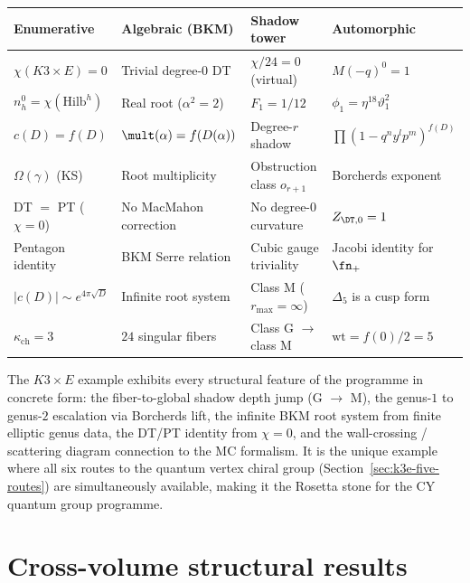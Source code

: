 \begin{center}
\renewcommand{\arraystretch}{1.3}
\begin{tabular}{@{}llll@{}}
\textbf{Enumerative} & \textbf{Algebraic (BKM)} & \textbf{Shadow tower} & \textbf{Automorphic} \\ \hline
$\chi(K3 \times E) = 0$ & Trivial degree-$0$ DT & $\chi/24 = 0$ (virtual) & $M(-q)^0 = 1$ \\
$n_h^0 = \chi(\mathrm{Hilb}^h)$ & Real root ($\alpha^2 = 2$) & $F_1 = 1/12$ & $\phi_1 = \eta^{18}\vartheta_1^2$ \\
$c(D) = f(D)$ & $\mult(\alpha) = f(D(\alpha))$ & Degree-$r$ shadow & $\prod (1 - q^ny^lp^m)^{f(D)}$ \\
$\Omega(\gamma)$ (KS) & Root multiplicity & Obstruction class $o_{r+1}$ & Borcherds exponent \\
DT $=$ PT ($\chi = 0$) & No MacMahon correction & No degree-$0$ curvature & $Z_{\DT,0} = 1$ \\
Pentagon identity & BKM Serre relation & Cubic gauge triviality & Jacobi identity for $\fn_+$ \\
$|c(D)| \sim e^{4\pi\sqrt{D}}$ & Infinite root system & Class M ($r_{\max} = \infty$) & $\Delta_5$ is a cusp form \\
$\kappa_{\mathrm{ch}} = 3$ & $24$ singular fibers & Class G $\to$ class M & $\mathrm{wt} = f(0)/2 = 5$
\end{tabular}
\end{center}

\begin{remark}
\label{rem:k3e-paradigm}
The $K3 \times E$ example exhibits every structural feature of the programme in concrete form: the fiber-to-global shadow depth jump (G $\to$ M), the genus-$1$ to genus-$2$ escalation via Borcherds lift, the infinite BKM root system from finite elliptic genus data, the DT/PT identity from $\chi = 0$, and the wall-crossing / scattering diagram connection to the MC formalism. It is the unique example where all six routes to the quantum vertex chiral group (Section~\ref{sec:k3e-five-routes}) are simultaneously available, making it the Rosetta stone for the CY quantum group programme.
\end{remark}

\section{Cross-volume structural results}
\label{sec:k3e-cross-volume}

